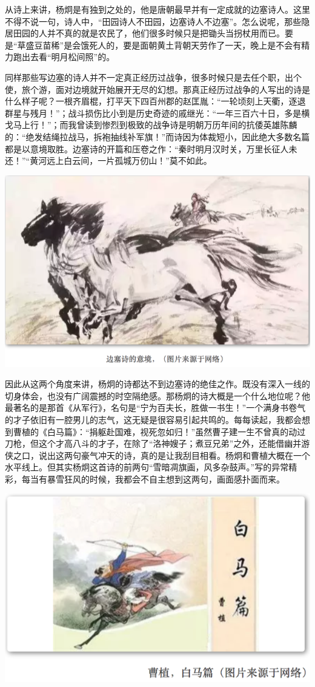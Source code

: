 \documentclass[]{book}
\begin{document}
从诗上来讲，杨炯是有独到之处的，他是唐朝最早并有一定成就的边塞诗人。这里不得不说一句，诗人中，``田园诗人不田园，边塞诗人不边塞''。怎么说呢，那些隐居田园的人并不真的就是农民了，他们很多时候只是把锄头当拐杖用而已。要是``草盛豆苗稀''是会饿死人的，要是面朝黄土背朝天劳作了一天，晚上是不会有精力跑出去看``明月松间照''的。

同样那些写边塞的诗人并不一定真正经历过战争，很多时候只是去任个职，出个使，旅个游，面对边境就开始展开无尽的幻想。那真正经历过战争的人写出的诗是什么样子呢？一根齐眉棍，打平天下四百州郡的赵匡胤：``一轮顷刻上天衢，逐退群星与残月！''；战斗损伤比小到是历史奇迹的戚继光：``一年三百六十日，多是横戈马上行！''；而我曾读到惨烈到极致的战争诗是明朝万历年间的抗倭英雄陈麟的：``绝发结绳拉战马，拆袍抽线补军旗！''而诗因为体裁短小，因此绝大多数名篇都是以意境取胜。边塞诗的开篇和压卷之作：``秦时明月汉时关，万里长征人未还！''``黄河远上白云间，一片孤城万仞山！''莫不如此。

\includegraphics[width=8.33in]{images/ctsj1}

因此从这两个角度来讲，杨炯的诗都达不到边塞诗的绝佳之作。既没有深入一线的切身体会，也没有广阔震撼的时空隔绝感。那杨炯的诗大概是一个什么地位呢？他最著名的是那首《从军行》，名句是``宁为百夫长，胜做一书生！''一个满身书卷气的才子依旧有一腔男儿的志气，这无疑是很容易引起共鸣的。每每读起，我都会想到曹植的《白马篇》：``捐躯赴国难，视死忽如归！''虽然曹子建一生不曾真的动过刀枪，但这个才高八斗的才子，在除了``洛神嫂子；煮豆兄弟''之外，还能借幽并游侠之口，说出这两句豪气冲天的诗，真的是让我刮目相看。杨炯和曹植大概在一个水平线上。但其实杨炯这首诗的前两句``雪暗凋旗画，风多杂鼓声。''写的异常精彩，每当有暴雪狂风的时候，我都会不自主想到这两句，画面感扑面而来。

\includegraphics[width=8.33in]{images/ctsj2}
\end{document}
